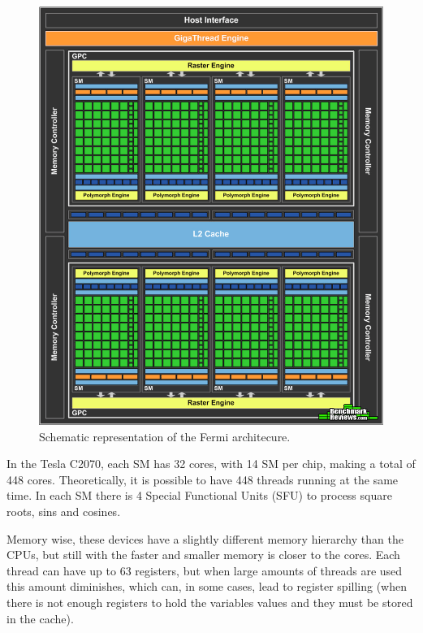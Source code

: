 \begin{figure}[!htp]
	\begin{center}
		\includegraphics[scale=0.3]{../../common/img/fermi_arch.png}
		\caption{Schematic representation of the \nvidia Fermi architecure.}
		\label{fig:fermi}
	\end{center}
\end{figure}

In the Tesla C2070, each SM has 32 \cuda cores, with 14 SM per chip, making a total of 448 \cuda cores. Theoretically, it is possible to have 448 \cuda threads running at the same time. In each SM there is 4 Special Functional Units (SFU) to process square roots, sins and cosines.

Memory wise, these devices have a slightly different memory hierarchy than the CPUs, but still with the faster and smaller memory is closer to the \cuda cores. Each \cuda thread can have up to 63 registers, but when large amounts of threads are used this amount diminishes, which can, in some cases, lead to register spilling (when there is not enough registers to hold the variables values and they must be stored in the cache).

